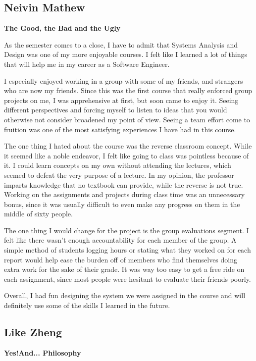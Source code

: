 \documentclass[12pt,letterpaper]{article}
\begin{document}
\subsection{Neivin Mathew}
\textbf{The Good, the Bad and the Ugly}\par
As the semester comes to a close, I have to admit that Systems Analysis and Design was one of my more enjoyable courses. I felt like I learned a lot of things that will help me in my career as a Software Engineer.\par
I especially enjoyed working in a group with some of my friends, and strangers who are now my friends. Since this was the first course that really enforced group projects on me, I was apprehensive at first, but soon came to enjoy it. Seeing different perspectives and forcing myself to listen to ideas that you would otherwise not consider broadened my point of view. Seeing a team effort come to fruition was one of the most satisfying experiences I have had in this course.\par
The one thing I hated about the course was the reverse classroom concept. While it seemed like a noble endeavor, I felt like going to class was pointless because of it. I could learn concepts on my own without attending the lectures, which seemed to defeat the very purpose of a lecture. In my opinion, the professor imparts knowledge that no textbook can provide, while the reverse is not true. Working on the assignments and projects during class time was an unnecessary bonus, since it was usually difficult to even make any progress on them in the middle of sixty people.\par
The one thing I would change for the project is the group evaluations segment. I felt like there wasn't enough accountability for each member of the group. A simple method of students logging hours or stating what they worked on for each report would help ease the burden off of members who find themselves doing extra work for the sake of their grade. It was way too easy to get a free ride on each assignment, since most people were hesitant to evaluate their friends poorly.\par
Overall, I had fun designing the system we were assigned in the course and will definitely use some of the skills I learned in the future.
		
	
\clearpage
\subsection{Like Zheng}
\textbf{Yes!And... Philosophy}\par
\end{document}
